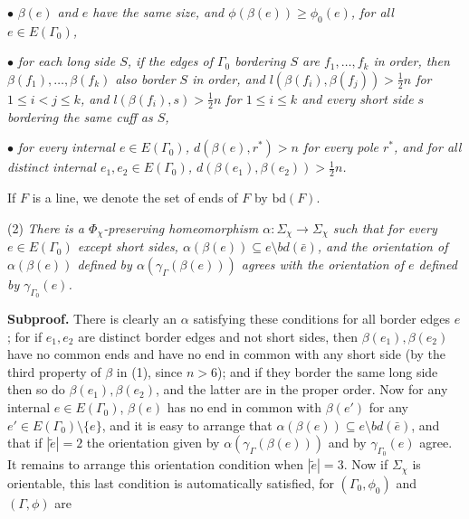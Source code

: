 \hspace*{12pt}$\bullet$ \textit{$\beta(e)$ and $e$ have the same size, and $\phi(\beta(e)) \ge \phi_0(e)$, for all $e \in E(\Gamma_0)$,}

\hspace*{12pt}$\bullet$ \textit{for each long side $S$, if the edges of $\Gamma_0$ bordering $S$ are $f_1, \dots, f_k$ in order, then $\beta(f_1), \dots, \beta(f_k)$ also border $S$ in order, and $l(\beta(f_i), \beta(f_j)) > \frac{1}{2}n$ for $1 \le i < j \le k$, and $l(\beta(f_i), s) > \frac{1}{2}n$ for $1 \le i \le k$ and every short side $s$ bordering the same cuff as $S$,}

\hspace*{12pt}$\bullet$ \textit{for every internal $e \in E(\Gamma_0)$, $d(\beta(e), r^*) > n$ for every pole $r^*$, and for all distinct internal $e_1, e_2 \in E(\Gamma_0)$, $d(\beta(e_1), \beta(e_2)) > \frac{1}{2}n$.}

If $F$ is a line, we denote the set of ends of $F$ by $\text{bd}(F)$.

\hspace*{12pt}(2) \textit{There is a $\Phi_\chi$-preserving homeomorphism $\alpha \colon \Sigma_\chi \to \Sigma_\chi$ such that for every $e \in E(\Gamma_0)$ except short sides, $\alpha(\beta(e)) \subseteq e \setminus bd(\bar{e})$, and the orientation of $\alpha(\beta(e))$ defined by $\alpha(\gamma_\Gamma(\beta(e)))$ agrees with the orientation of $e$ defined by $\gamma_{\Gamma_0}(e)$.}

\textbf{Subproof.} There is clearly an $\alpha$ satisfying these conditions for all border edges $e$; for if $e_1, e_2$ are distinct border edges and not short sides, then $\beta(e_1), \beta(e_2)$ have no common ends and have no end in common with any short side (by the third property of $\beta$ in (1), since $n > 6$); and if they border the same long side then so do $\beta(e_1), \beta(e_2)$, and the latter are in the proper order. Now for any internal $e \in E(\Gamma_0)$, $\beta(e)$ has no end in common with $\beta(e')$ for any $e' \in E(\Gamma_0) \setminus \{e\}$, and it is easy to arrange that $\alpha(\beta(e)) \subseteq e \setminus bd(\bar{e})$, and that if $|\tilde{e}| = 2$ the orientation given by $\alpha(\gamma_\Gamma(\beta(e)))$ and by $\gamma_{\Gamma_0}(e)$ agree. It remains to arrange this orientation condition when $|\tilde{e}| = 3$. Now if $\Sigma_\chi$ is orientable, this last condition is automatically satisfied, for $(\Gamma_0, \phi_0)$ and $(\Gamma, \phi)$ are
